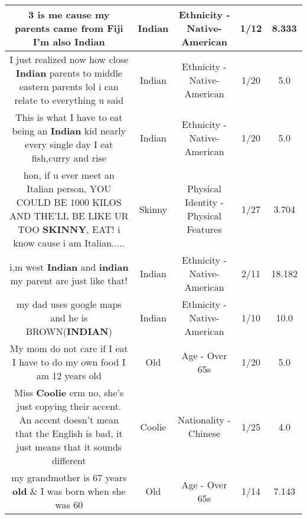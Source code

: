 \documentclass[11pt]{article}
\newlength\mylength
\begin{document}
\begin{center}
\begin{longtable}{|C{.65\mylength}|C{.30\mylength}|C{.12\mylength}|C{.12\mylength}|C{.12\mylength}|}
  \small 3 is me cause my parents came from Fiji I'm also Indian\normalsize   & Indian & Ethnicity - Native-American & 1/12 & 8.333 \\  \hline
  \small I just realized now how close \textbf{Indian} parents to middle eastern parents lol i can relate to everything u said\normalsize   & Indian & Ethnicity - Native-American & 1/20 & 5.0 \\  \hline
  \small This is what I have to eat being an \textbf{Indian} kid nearly every single day I eat fish,curry and rise\normalsize   & Indian & Ethnicity - Native-American & 1/20 & 5.0 \\  \hline
  \small hon, if u ever meet an Italian person, YOU COULD BE 1000 KILOS AND THE'LL BE LIKE UR TOO \textbf{SKINNY}, EAT! i know cause i am Italian.....\normalsize   & Skinny & Physical Identity - Physical Features & 1/27 & 3.704 \\  \hline
  \small i,m west \textbf{Indian} and \textbf{indian} my parent are just like that!\normalsize   & Indian & Ethnicity - Native-American & 2/11 & 18.182 \\  \hline
  \small my dad uses google maps and he is BROWN(\textbf{INDIAN})\normalsize   & Indian & Ethnicity - Native-American & 1/10 & 10.0 \\  \hline
  \small My mom do not care if I eat I have to do my own food I am 12 years old\normalsize   & Old & Age - Over 65s & 1/20 & 5.0 \\  \hline
  \small Miss \textbf{Coolie} erm no, she's just copying their accent. An accent doesn't mean that the English is bad, it just means that it sounds different\normalsize   & Coolie & Nationality - Chinese & 1/25 & 4.0 \\  \hline
  \small my grandmother is 67 years \textbf{old} \& I was born when she was 60\normalsize   & Old & Age - Over 65s & 1/14 & 7.143 \\  \hline

\end{longtable}
\end{center}
\end{document}
